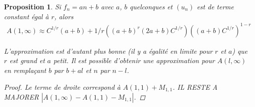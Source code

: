 \documentclass{article}
\newtheorem{prop}{Proposition}
\begin{document}
\begin{prop}
Si $f_n = an+b$ avec $a$, $b$ quelconques et $(u_n)$ est de terme constant égal à $r$, alors 
\begin{align*}
A(1,\infty) \approx C^{1/r}(a+b)+1/r((a+b)^{r}(2a+b) C^{1/r})((a+b) C^{1/r})^{1-r}
\end{align*}

L'approximation est d'autant plus bonne (il y a égalité en limite pour $r$ et $a$) que $r$ est grand et $a$ petit. Il est possible d'obtenir une approximation pour $A(l,\infty)$ en remplaçant $b$ par $b+al$ et $n$ par $n-l$.
\begin{proof}
Le terme de droite correspond à $A(1,1)+M_{1,1}$. IL RESTE A MAJORER $|A(1,\infty)-A(1,1)-M_{1,1}|$.
\end{proof}
\end{prop}
\end{document}

